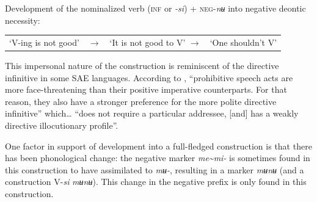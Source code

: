 \documentclass[output=paper,colorlinks,citecolor=brown]{langscibook}
\begin{document}

\ea \label{figure1} \textnormal{Development of the nominalized verb (\textsc{inf} or \textit{-si}) + \textsc{neg}-\textit{nʉ} into negative deontic necessity:}\\

\begin{tabular}{llll}\\[-2ex]
\textnormal{`V-ing is not good'}&
$\rightarrow$ & \textnormal{`It is not good to V'} $\rightarrow$ & \textnormal{`One shouldn't V'} \end{tabular}
\z

 This impersonal nature of the construction is reminiscent of the directive infinitive in some SAE languages. According to \citet[502]{VanOlmen2010}, ``prohibitive speech acts are more face-threatening than their positive imperative counterparts. For that reason, they also have a stronger preference for the more polite directive infinitive'' which… ``does not require a particular addressee, [and] has a weakly directive illocutionary profile''.

One factor in support of development into a full-fledged construction is that there has been phonological change: the negative marker \textit{me{\textasciitilde}mi-} is sometimes found in this construction to have assimilated to \textit{mʉ-}, resulting in a marker \textit{mʉnʉ} (and a construction V-\textit{si} \textit{mʉnʉ}). This change in the negative prefix is only found in this construction. 
\end{document}
